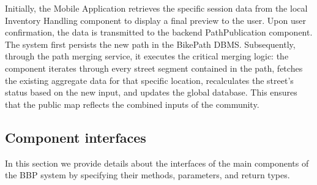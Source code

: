 \noindent Initially, the Mobile Application retrieves the specific session data from the local Inventory Handling component to display a final preview to the user. Upon user confirmation, the data is transmitted to the backend PathPublication component.\\

\noindent The system first persists the new path in the BikePath DBMS. Subsequently, through the path merging service, it executes the critical merging logic: the component iterates through every street segment contained in the path, fetches the existing aggregate data for that specific location, recalculates the street's status 
based on the new input, and updates the global database. This ensures that the public map reflects the combined inputs of the community.


\subsection{Component interfaces}
In this section we provide details about the interfaces of the main components of the BBP system by specifying their methods, parameters, and return types.

